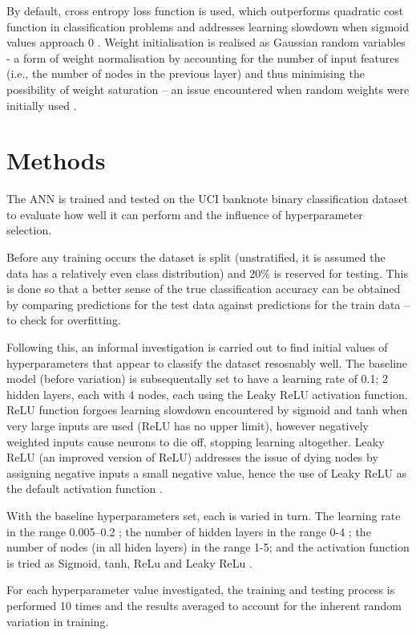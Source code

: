 \documentclass[12pt]{article}
\begin{document}
By default, cross entropy loss function is used, which outperforms
quadratic cost function in classification problems and addresses
learning slowdown when sigmoid values approach 0 \cite{Nielsen}
\cite{Xavier}. Weight initialisation is realised as Gaussian random
variables - a form of weight normalisation by accounting for the number
of input features (i.e., the number of nodes in the previous layer) and
thus minimising the possibility of weight saturation -- an issue
encountered when random weights were initially used \cite{Nielsen}.

\section{Methods}

The ANN is trained and tested on the UCI banknote binary
classification dataset to evaluate how well it can perform and the
influence of hyperparameter selection.

Before any training occurs the dataset is split (unstratified, it is
assumed the data has a relatively even class distribution) and 20\%
is reserved for testing. This is done so that a better sense of the
true classification accuracy can be obtained by comparing predictions
for the test data against predictions for the train data -- to check for
overfitting.

Following this, an informal investigation is carried out to find initial
values of hyperparameters that appear to classify the dataset resosnably
well. The baseline model (before variation) is subsequentally set to
have a learning rate of 0.1; 2 hidden layers, each with 4 nodes,
each using the Leaky ReLU activation function. ReLU function forgoes learning slowdown encountered by sigmoid and tanh when very large inputs are used (ReLU has no upper limit), however negatively weighted inputs cause neurons to die off, stopping learning altogether. Leaky ReLU (an improved version of ReLU) addresses the issue of dying nodes by assigning negative inputs a small negative value, hence the use of Leaky ReLU as the default activation function \cite{Niwa}.

With the baseline hyperparameters set, each is varied in turn. The
learning rate in the range 0.005--0.2 \cite{Nielsen}; the number of hidden layers in
the range 0-4 \cite{Xavier}; the number of nodes (in all hiden layers) in the range
1-5; and the activation function is tried as Sigmoid, tanh, ReLu and
Leaky ReLu \cite{Niwa}.

For each hyperparameter value investigated, the training and testing
process is performed 10 times and the results averaged to account for
the inherent random variation in training.
\end{document}
